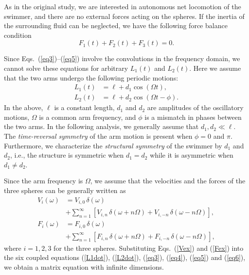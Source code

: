 \documentclass[nofootinbib,twocolumn,showpacs,preprintnumbers,pre,aps]{revtex4-1}
\begin{document}
As in the original study, we are interested in autonomous net locomotion of the swimmer, 
and there are no external forces acting on the spheres.
If the inertia of the surrounding fluid can be neglected, we have the following force balance 
condition 
\begin{equation}
\label{eq6}
F_1(t)+F_2(t)+F_3(t)=0.
\end{equation}


Since Eqs.~(\ref{eq3})--(\ref{eq5}) involve the convolutions in the frequency domain, 
we cannot solve these equations for arbitrary $L_1(t)$ and $L_2(t)$. 
Here we assume that the two arms undergo the following periodic motions: 
\begin{align}
\label{L1cos}
L_1(t)&=\ell+d_1\cos(\Omega t),
\\
\label{L2cos}
L_2(t)&=\ell+d_2\cos(\Omega t-\phi).
\end{align}
In the above, $\ell$ is a constant length, $d_1$ and $d_2$ are amplitudes of the oscillatory 
motions, $\Omega$ is a common arm frequency, and $\phi$ is a mismatch in phases 
between the two arms.
In the following analysis, we generally assume that $d_1, d_2 \ll \ell$. 
The \textit{time-reversal symmetry} of the arm motion is present when $\phi=0$ and $\pi$.
Furthermore, we characterize the \textit{structural symmetry} of the swimmer by $d_1$ and $d_2$, 
i.e., the structure is symmetric when $d_1=d_2$ while it is asymmetric when $d_1 \ne d_2$.


Since the arm frequency is $\Omega$,  we assume that the velocities 
and the forces of the three spheres can be generally written as 
\begin{align}
V_i(\omega)& =V_{i,0}\,\delta(\omega)\nonumber\\
&+\sum_{n=1}^\infty \left[V_{i,n}\,\delta(\omega+n\Omega)+V_{i,-n}\,\delta(\omega-n\Omega)\right],
\label{Vex}\\
F_i(\omega)& =F_{i,0}\,\delta(\omega)\nonumber\\
&+\sum_{n=1}^\infty \left[F_{i,n}\,\delta(\omega+n\Omega)+F_{i,-n}\,\delta(\omega-n\Omega)\right],
\label{Fex}
\end{align}
where $i=1,2,3$ for the three spheres. 
Substituting Eqs.~(\ref{Vex}) and (\ref{Fex}) into the six coupled equations 
(\ref{L1dot}), (\ref{L2dot}), (\ref{eq3}), (\ref{eq4}), (\ref{eq5}) and 
(\ref{eq6}),  we obtain a matrix equation with infinite dimensions.
\end{document}
